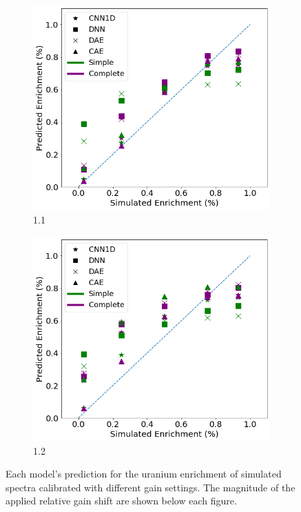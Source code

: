 \begin{figure}[H]
	\begin{subfigure}[b]{0.49\textwidth}
		\centering
		\includegraphics[width=\textwidth]{images/simuranium-cal11.png}
		\caption{1.1}
		\label{fig:simuranium-cal11}
	\end{subfigure}
	\hfill
	\begin{subfigure}[b]{0.49\textwidth}
		\centering
		\includegraphics[width=\textwidth]{images/simuranium-cal12.png}
		\caption{1.2}
		\label{fig:simuranium-cal12}
	\end{subfigure}
	\caption{Each model's prediction for the uranium enrichment of simulated spectra calibrated with  different gain settings. The magnitude of the applied relative gain shift are shown below each figure.}
	\label{fig:simuranium-cal}
\end{figure}


